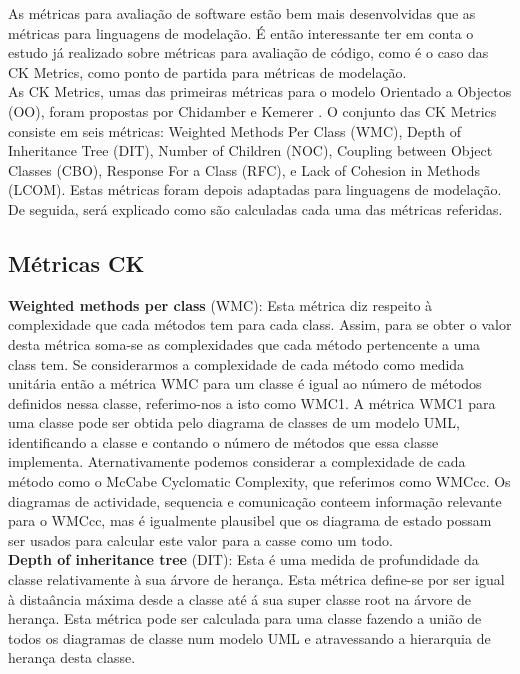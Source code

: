 As métricas para avaliação de  software estão bem mais desenvolvidas que as métricas para linguagens de modelação. É então interessante ter em conta o estudo já realizado sobre métricas para avaliação de código, como é o caso das CK Metrics, como ponto de partida para métricas de modelação.\\
As CK Metrics, umas das primeiras métricas para o modelo Orientado a Objectos (OO), foram propostas por Chidamber e  Kemerer \cite{Chidamber:1994:MSO:630808.631131}. O conjunto das CK Metrics consiste em seis métricas: Weighted Methods Per Class (WMC), Depth of Inheritance Tree (DIT), Number of Children (NOC), Coupling between Object Classes (CBO), Response For a Class (RFC), e Lack of Cohesion in Methods (LCOM). Estas métricas foram depois adaptadas para linguagens de modelação. De seguida, será explicado como são calculadas cada uma das métricas referidas.

\subsection{Métricas \textrm{CK}}
\textbf{Weighted methods per class} (WMC):
Esta métrica diz respeito à complexidade que cada métodos tem para cada class. Assim, para se obter o valor desta métrica soma-se
as complexidades que cada método pertencente a uma class tem. Se considerarmos a complexidade de cada método como medida unitária
então a métrica WMC para um classe é igual ao número de métodos definidos nessa classe, referimo-nos a isto como WMC1.
A métrica WMC1 para uma classe pode ser obtida pelo diagrama de classes de um modelo UML, identificando a classe e contando o número
de métodos que essa classe implementa. Aternativamente podemos considerar a complexidade de cada método como o McCabe Cyclomatic Complexity, que referimos
como WMCcc. Os diagramas de actividade, sequencia e comunicação conteem informação relevante para o WMCcc, mas é igualmente
plausibel que os diagrama de estado possam ser usados para calcular este valor para a casse como um todo.\\

\textbf{Depth of inheritance tree} (DIT):
Esta é uma medida de profundidade da classe relativamente à sua árvore de herança. Esta métrica define-se por ser igual à distaância máxima
desde a classe até á sua super classe root na árvore de herança. Esta métrica pode ser calculada para uma classe fazendo a união de todos os diagramas
de classe num modelo UML e atravessando a hierarquia de herança desta classe.\\

